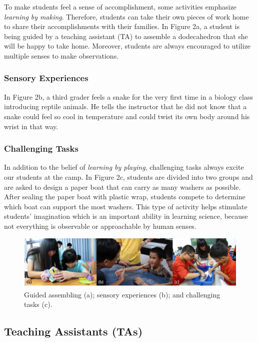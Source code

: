 \documentclass[11.5pt]{sig-alternate} %
\begin{document}
\begin{large}
To make students feel a sense of accomplishment, some activities emphasize \textit{learning by making}. Therefore, students can take their own pieces of work home to share their accomplishments with their families. In Figure 2a, a student is being guided by a teaching assistant (TA) to assemble a dodecahedron that she will be happy to take home. Moreover, students are always encouraged to utilize multiple senses to make observations.

\subsubsection*{Sensory Experiences}

In Figure 2b, a third grader feels a snake for the very first time in a biology class introducing reptile animals. He tells the instructor that he did not know that a snake could feel so cool in temperature and could twist its own body around his wrist in that way.

\subsubsection*{Challenging Tasks}

In addition to the belief of \textit{learning by playing}, challenging tasks always excite our students at the camp. In Figure 2c, students are divided into two groups and are asked to design a paper boat that can carry as many washers as possible. After sealing the paper boat with plastic wrap, students compete to determine which boat can support the most washers. This type of activity helps stimulate students’ imagination which is an important ability in learning science, because not everything is observable or approachable by human senses.

\begin{figure}[th]
    \centering
    \includegraphics[width=1\linewidth]{Fig2.png}
    \caption{Guided assembling (a); sensory experiences (b); and challenging tasks (c).}
\end{figure}

\subsection*{Teaching Assistants (TAs)}


\end{large}
\end{document}
